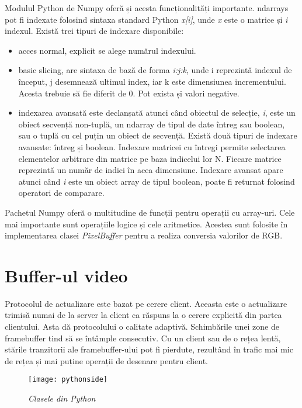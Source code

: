 Modulul Python de Numpy oferă și acesta funcționalități importante. ndarrays pot fi indexate folosind sintaxa standard Python \textit{x[i]}, unde \textit{x} este o matrice și \textit{i} indexul. Există trei tipuri de indexare disponibile:
\begin{itemize}
  \item acces normal, explicit se alege numărul indexului.
  \item basic slicing, are sintaxa de bază de forma \textit{i:j:k}, unde i reprezintă indexul de început, j desemnează ultimul index, iar k este dimensiunea incrementului. Acesta trebuie să fie diferit de 0. Pot exista și valori negative.
  \item indexarea avansată este declanșată atunci când obiectul de selecție, \textit{i}, este un obiect secvență non-tuplă, un ndarray de tipul de date întreg sau boolean, sau o tuplă cu cel puțin un obiect de secvență. Există două tipuri de indexare avansate: întreg și boolean. Indexare matricei cu întregi permite selectarea elementelor arbitrare din matrice pe baza indicelui lor N. Fiecare matrice reprezintă un număr de indici în acea dimensiune. Indexare avansat apare atunci când \textit{i} este un obiect array de tipul boolean, poate fi returnat folosind operatori de comparare.
\end{itemize} 

Pachetul Numpy oferă o multitudine de funcții pentru operații cu array-uri. Cele mai importante sunt operațiile logice și cele aritmetice. Acestea sunt folosite în implementarea clasei \textit{PixelBuffer} pentru a realiza conversia valorilor de RGB.




\section{Buffer-ul video}

Protocolul de actualizare este bazat pe cerere client. Aceasta este o actualizare trimisă numai
de la server la client ca răspuns la o cerere explicită din partea clientului. Asta dă protocolului o calitate adaptivă. Schimbările unei zone de framebuffer tind să se întâmple consecutiv. Cu un client sau
de o rețea lentă, stările tranzitorii ale framebuffer-ului pot fi pierdute, rezultând în trafic mai mic de rețea și mai puține operații de desenare pentru client.

\begin{figure}
    \centering
    \texttt{[image: pythonside]}
    \caption{\textit{Clasele din Python}}
    \label{pyside}
\end{figure}

